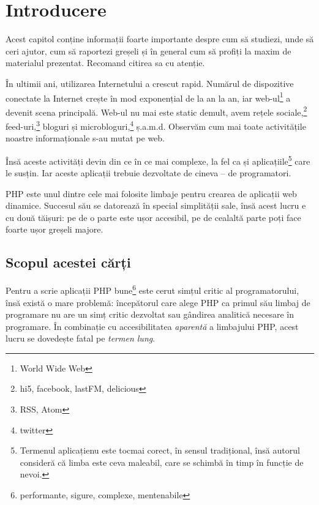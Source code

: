\fancyfoot[CO,C] {\thepage}
{}
\chapter*{Introducere}

\begin{chapsummary}

Acest capitol conține informații foarte importante despre cum să studiezi, unde
să ceri ajutor, cum să raportezi greșeli și în general cum să profiți la maxim
de materialul prezentat. Recomand citirea sa cu atenție.

\end{chapsummary}

În ultimii ani, utilizarea Internetului a crescut rapid. Numărul de dispozitive
conectate la Internet crește în mod exponențial de la an la an, iar
web-ul\footnote{World Wide Web} a devenit scena principală. Web-ul nu mai este
static demult, avem rețele sociale,\footnote{hi5, facebook, lastFM, delicious}
feed-uri,\footnote{RSS, Atom} bloguri și microbloguri,\footnote{twitter}
ș.a.m.d. Observăm cum mai toate activitățile noastre informaționale s-au mutat
pe web.

Însă aceste activități devin din ce în ce mai complexe, la fel ca și
aplicațiile\footnote{Termenul \glqq aplicație\grqq nu este tocmai corect, în sensul
tradițional, însă autorul consideră că limba este ceva maleabil, care se
schimbă în timp în funcție de nevoi.} care le susțin.
Iar aceste aplicații trebuie dezvoltate de cineva -- de programatori.

PHP este unul dintre cele mai folosite limbaje pentru crearea de aplicații
web dinamice. Succesul său se datorează în special simplității sale, însă
acest lucru e cu două tăișuri: pe de o parte este ușor accesibil, pe de
cealaltă parte poți face foarte ușor greșeli majore.

{}
\section*{Scopul acestei cărți}

Pentru a scrie aplicații PHP bune\footnote{performante, sigure, complexe, mentenabile}
este cerut simțul critic al programatorului,
însă există o mare problemă: începătorul care alege PHP ca
primul său limbaj de programare nu are un simț critic dezvoltat sau gândirea analitică
necesare în programare. În combinație cu accesibilitatea \textit{aparentă}
a limbajului PHP, acest lucru se dovedește fatal pe \textit{termen lung}.

